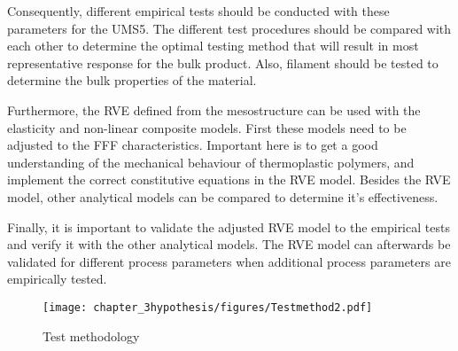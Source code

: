 Consequently, different empirical tests should be conducted with these parameters for the UMS5. The different test procedures should be compared with each other to determine the optimal testing method that will result in most representative response for the bulk product. Also, filament should be tested to determine the bulk properties of the material.

Furthermore, the RVE defined from the mesostructure can be used with the elasticity and non-linear composite models. First these models need to be adjusted to the FFF characteristics. Important here is to get a good understanding of the mechanical behaviour of thermoplastic polymers, and implement the correct constitutive equations in the RVE model. Besides the RVE model, other analytical models can be compared to determine it's effectiveness.  

Finally, it is important to validate the adjusted RVE model to the empirical tests and verify it with the other analytical models. The RVE model can afterwards be validated for different process parameters when additional process parameters are empirically tested. 



\begin{figure}[H]
    \centering
    \texttt{[image: chapter\_3hypothesis/figures/Testmethod2.pdf]}
    \caption{Test methodology}
    \label{fig:Test methodology}
\end{figure}

